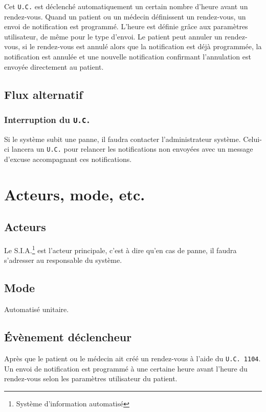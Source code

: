Cet \texttt{U.C.} est déclenché automatiquement un certain nombre d'heure avant un rendez-vous. Quand un patient ou un médecin
définissent un rendez-vous, un envoi de notification est programmé. L'heure est
définie grâce aux paramètres utilisateur, de même
pour le type d'envoi. Le patient peut annuler un rendez-vous, si le rendez-vous est annulé alors que la notification est déjà
programmée, la notification est annulée et une nouvelle notification confirmant
l'annulation est envoyée directement au 
patient.

\subsection{Flux alternatif}

\subsubsection{Interruption du \texttt{U.C.}}

Si le système subit une panne, il faudra contacter l'administrateur système.
Celui-ci lancera un \texttt{U.C.} pour relancer les notifications non envoyées avec un message d'excuse accompagnant ces
notifications.


\section{Acteurs, mode, etc.}

\subsection{Acteurs}

Le S.I.A.\footnote{Système d'information automatisé} est l'acteur principale, 
c'est à dire qu'en cas de panne, il faudra s'adresser au responsable du système.

\subsection{Mode}

Automatisé unitaire.

\subsection{Évènement déclencheur}

Après que le patient ou le médecin ait créé un rendez-vous à l'aide du \texttt{U.C. 1104}. 
Un envoi de notification est programmé à une certaine heure avant l'heure du rendez-vous selon les 
paramètres utilisateur du patient.

